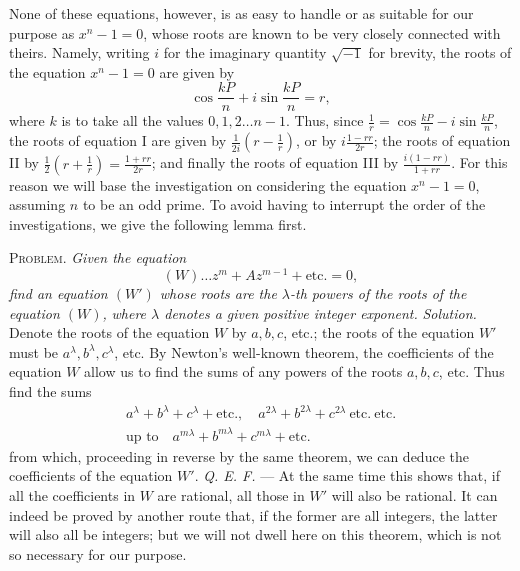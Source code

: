 None of these equations, however, is as easy to handle or as suitable for our purpose as \(x^n-1=0\), whose roots are known to be very closely connected with theirs. Namely, writing \(i\) for the imaginary quantity \(\surd{-1}\) for brevity, the roots of the equation \(x^n-1=0\) are given by \[\cos\frac{kP}n+i\sin\frac{kP}n=r,\]
where \(k\) is to take all the values \(0,\allowbreak 1,\allowbreak 2\ldots n-1\). Thus, since \(\frac1r=\cos\frac{kP}n-i\sin\frac{kP}n\), the roots of equation I are given by \(\frac1{2i}(r-\frac1r)\), or by \(i\frac{1-rr}{2r}\); the roots of equation II by \(\frac12(r+\frac1r)=\frac{1+rr}{2r}\); and finally the roots of equation III by \(\frac{i(1-rr)}{1+rr}\). For this reason we will base the investigation on considering the equation \(x^n-1=0\), assuming \(n\) to be an odd prime. To avoid having to interrupt the order of the investigations, we give the following lemma first.

\textsc{Problem.} \textit{Given the equation} \[(W)\ldots z^m+Az^{m-1}+\mathrm{etc.}=0,\] \textit{find an equation \((W')\) whose roots are the \(\lambda\)-th powers of the roots of the equation \((W)\),} \textit{where \(\lambda\) denotes a given positive integer exponent.} \textit{Solution.} Denote the roots of the equation \(W\) by \(a,\allowbreak b,\allowbreak c\), etc.; the roots of the equation \(W'\) must be \(a^\lambda,\allowbreak b^\lambda,\allowbreak c^\lambda\), etc. By Newton's well-known theorem, the coefficients of the equation \(W\) allow us to find the sums of any powers of the roots \(a,\allowbreak b,\allowbreak c\), etc. Thus find the sums \[\begin{gathered}
a^\lambda+b^\lambda+c^\lambda+\mathrm{etc.},\quad
a^{2\lambda}+b^{2\lambda}+c^{2\lambda}\ \mathrm{etc.}\ \mathrm{etc.}\\
\text{up to}\quad a^{m\lambda}+b^{m\lambda}+c^{m\lambda}+\mathrm{etc.}
\end{gathered}\] from which, proceeding in reverse by the same theorem, we can deduce the coefficients of the equation \(W'\). \textit{Q. E. F.} — At the same time this shows that, if all the coefficients in \(W\) are rational, all those in \(W'\) will also be rational. It can indeed be proved by another route that, if the former are all integers, the latter will also all be integers; but we will not dwell here on this theorem, which is not so necessary for our purpose.

